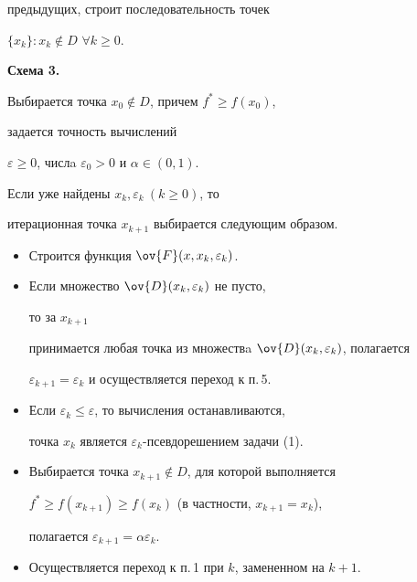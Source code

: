 предыдущих, строит последовательность точек


$\{x_k\}:x_k\notin D$ $\forall k\ge0$.


\medskip





{\bf Схема 3.}


Выбирается точка $x_0\notin D$, причем $f^*\ge f(x_0)$,


задается точность вычислений


$\varepsilon\ge0$, числa $\varepsilon_0>0$ и $\alpha\in (0,1)$.





Если уже найдены $x_k,\varepsilon_k~(k\geq0)$, то


итерационная точка $x_{k+1}$ выбирается следующим образом.


\begin{itemize}


\item[1.] Строится функция $\ov{F}(x,x_k,\varepsilon_k)$.


\item[2.] Если множество $\ov{D}(x_k,\varepsilon_k)$ не пусто,


то за $x_{k+1}$


принимается любая точка из множествa $\ov{D}(x_k,\varepsilon_k)$, полагается


$\varepsilon_{k+1}=\varepsilon_k$ и осуществляется переход к п.\,5.


\item[3.] Если $\varepsilon_k\le \varepsilon$, то вычисления останавливаются,


точка $x_k$ является $\varepsilon_k$-псевдорешением задачи (1).


\item[4.] Выбирается точка $x_{k+1}\notin D$, для которой выполняется


$f^*\ge f(x_{k+1})\ge f(x_k)$ (в частности, $x_{k+1}=x_k$),


полагается $\varepsilon_{k+1}=\alpha\varepsilon_k$. 


\item[5.] Осуществляется переход к п.\,1 при $k$, замененном на $k+1$.


\end{itemize}


\setcounter{note}{0}





